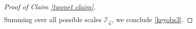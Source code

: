 \documentclass{article}
\newcommand{\1}{\mathds{1}}
\numberwithin{equation}{section}
\newcommand{\al}{\alpha}
\newcommand{\be}{\begin{equation}}
\newcommand{\ee}{\end{equation}}
\newcommand{\e}{{\varepsilon}}
\renewcommand{\cal}{\mathcal}
\newcommand{\wt}{\widetilde}
\theoremstyle{plain} %
\theoremstyle{remark}
\newcommand{\AIT}{\mathcal A_{IT}}
\begin{document}
\begin{proof}[Proof of Claim \ref{twonet claim}]
\begin{align}
\end{align}  
Summing over all possible scales $\cal I_{\vec a}$, we conclude \eqref{keyobs3}.



\end{proof}
\end{document}
